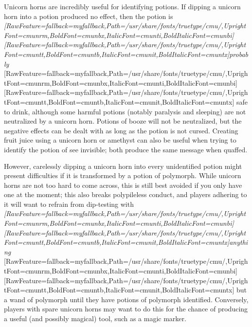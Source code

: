 Unicorn horns are incredibly useful for identifying potions. If dipping a unicorn horn into a potion produced no effect, then the potion is {\itshape \allowbreak{}\setmainfont{cmunti.ttf}[RawFeature={fallback=myfallback},Path=/usr/share/fonts/truetype/cmu/,UprightFont=cmunrm,BoldFont=cmunbx,ItalicFont=cmunti,BoldItalicFont=cmunbi]\setmonofont{cmunti.ttf}[RawFeature={fallback=myfallback},Path=/usr/share/fonts/truetype/cmu/,UprightFont=cmuntt,BoldFont=cmuntb,ItalicFont=cmunit,BoldItalicFont=cmuntx]\itshape probably}{$\text{ }$}\allowbreak{}\setmainfont{cmunrm.ttf}[RawFeature={fallback=myfallback},Path=/usr/share/fonts/truetype/cmu/,UprightFont=cmunrm,BoldFont=cmunbx,ItalicFont=cmunti,BoldItalicFont=cmunbi]\setmonofont{cmunrm.ttf}[RawFeature={fallback=myfallback},Path=/usr/share/fonts/truetype/cmu/,UprightFont=cmuntt,BoldFont=cmuntb,ItalicFont=cmunit,BoldItalicFont=cmuntx] safe to drink, although some harmful potions (notably paralysis\footnotemark[127] and sleeping\footnotemark[128]) are not neutralized by a unicorn horn. Potions of booze will not be neutralized, but the negative effects can be dealt with as long as the potion is not cursed. Creating fruit juice using a unicorn horn or amethyst can also be useful when trying to identify the potion of see invisible\footnotemark[129]; both produce the same message when quaffed.


However, carelessly dipping a unicorn horn into every unidentified potion might present difficulties if it is transformed by a potion of polymorph. While unicorn horns are not too hard to come across, this is still best avoided if you only have one at the moment; this also breaks polypileless conduct\footnotemark[130], and players adhering to it will want to refrain from dip-{}testing with {\itshape \allowbreak{}\setmainfont{cmunti.ttf}[RawFeature={fallback=myfallback},Path=/usr/share/fonts/truetype/cmu/,UprightFont=cmunrm,BoldFont=cmunbx,ItalicFont=cmunti,BoldItalicFont=cmunbi]\setmonofont{cmunti.ttf}[RawFeature={fallback=myfallback},Path=/usr/share/fonts/truetype/cmu/,UprightFont=cmuntt,BoldFont=cmuntb,ItalicFont=cmunit,BoldItalicFont=cmuntx]\itshape anything}{$\text{ }$}\allowbreak{}\setmainfont{cmunrm.ttf}[RawFeature={fallback=myfallback},Path=/usr/share/fonts/truetype/cmu/,UprightFont=cmunrm,BoldFont=cmunbx,ItalicFont=cmunti,BoldItalicFont=cmunbi]\setmonofont{cmunrm.ttf}[RawFeature={fallback=myfallback},Path=/usr/share/fonts/truetype/cmu/,UprightFont=cmuntt,BoldFont=cmuntb,ItalicFont=cmunit,BoldItalicFont=cmuntx] but a wand of polymorph\footnotemark[131] until they have potions of polymorph identified. Conversely, players with spare unicorn horns may want to do this for the chance of producing a useful (and possibly magical\footnotemark[132]) tool\footnotemark[133], such as a magic marker\footnotemark[134].


